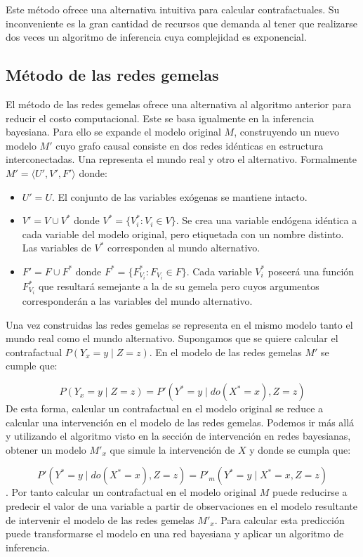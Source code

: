 Este método ofrece una alternativa intuitiva para calcular contrafactuales. Su inconveniente es la gran cantidad de recursos que demanda al tener que realizarse dos veces un algoritmo de inferencia cuya complejidad es exponencial.		

\subsection{Método de las redes gemelas}\label{sec:tn}
El método de las redes gemelas \cite{grahamcopy, balke1995probabilistic} ofrece una alternativa al algoritmo anterior para reducir el costo computacional. Este se basa igualmente en la inferencia bayesiana. Para ello se expande el modelo original $M$, construyendo un nuevo modelo $M'$ cuyo grafo causal consiste en dos redes idénticas en estructura interconectadas. Una representa el mundo real y otro el alternativo. Formalmente $M'=\langle U',V',F'\rangle$ donde:
\begin{itemize}
	\item $U'= U$. El conjunto de las variables exógenas se mantiene intacto.
	\item $V' = V \cup V^{\ast}$ donde $V^{\ast}=\{V_i^{\ast}: V_i \in V \}$. Se crea una variable endógena idéntica a cada variable del modelo original, pero etiquetada con un nombre distinto. Las variables de $V^{\ast}$ corresponden al mundo alternativo.
	\item $F' = F \cup F^{\ast}$ donde $F^{\ast}=\{F_{V_i}^{\ast}: F_{V_i} \in F\}$. Cada variable $V_i^{\ast}$ poseerá una función $F_{V_i}^{\ast}$ que resultará semejante a la de su gemela pero cuyos argumentos corresponderán a las variables del mundo alternativo.
\end{itemize}

Una vez construidas las redes gemelas se representa en el mismo modelo tanto el mundo real como el mundo alternativo. Supongamos que se quiere calcular el contrafactual $P(Y_x=y \mid Z=z)$. En el modelo de las redes gemelas $M'$ se cumple que:

\[P(Y_x=y \mid Z=z) = P'(Y^{\ast}=y \mid do(X^{\ast}=x), Z=z)\]
De esta forma, calcular un contrafactual en el modelo original se reduce a calcular una intervención en el modelo de las redes gemelas. Podemos ir más allá y utilizando el algoritmo visto en la sección de intervención en redes bayesianas, obtener un modelo $M'_x$ que simule la intervención de $X$ y donde se cumpla que:

\[P'(Y^{\ast}=y \mid do(X^{\ast}=x), Z=z) = P'_m(Y^{\ast}=y \mid X^{\ast}=x, Z=z)\].
Por tanto calcular un contrafactual en el modelo original $M$ puede reducirse a predecir el valor de una variable a partir de observaciones en el modelo resultante de intervenir el modelo de las redes gemelas $M'_x$. Para calcular esta predicción puede transformarse el modelo en una red bayesiana y aplicar un algoritmo de inferencia.

